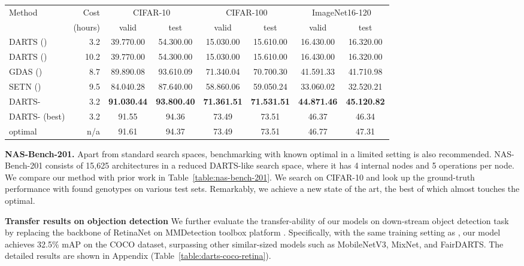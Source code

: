\documentclass{article} \usepackage{iclr2021_conference,times}
\newcommand{\citeyp}[1]{(\citeyear{#1})}
\begin{document}
\begin{table*}[tb!]
	\setlength{\tabcolsep}{2pt}
	\begin{center}
		\caption{Searching performance on NAS-Bench-201 \citep{dong2020nasbench201}. Our method robustly obtains new SOTA. Averaged on 4 runs of searching. : first-order, : second-order }
		\label{table:nas-bench-201}
		\small
		\begin{tabular}{lr*{6}{c}}
			\toprule
			Method	& Cost  & \multicolumn{2}{c}{CIFAR-10}  & \multicolumn{2}{c}{CIFAR-100}   & \multicolumn{2}{c}{ImageNet16-120}   \\
  & (hours) & valid & test & valid & test & valid & test \\
 \midrule
	DARTS \citeyp{liu2018darts} & 3.2 & 39.770.00 & 54.300.00 & 15.030.00 & 15.610.00 & 16.430.00 & 16.320.00 \\
	DARTS \citeyp{liu2018darts} & 10.2 & 39.770.00 & 54.300.00 & 15.030.00 & 15.610.00 & 16.430.00 & 16.320.00 \\
	GDAS \citeyp{dong2019searching}  &  8.7 & 89.890.08 & 93.610.09 & 71.340.04 & 70.700.30 & 41.591.33 & 41.710.98 \\
	SETN \citeyp{dong2019one} & 9.5 & 84.040.28 & 87.640.00 & 58.860.06 & 59.050.24 & 33.060.02 & 32.520.21   \\ 
DARTS- & 3.2 & \textbf{91.030.44}	& \textbf{93.800.40} &	\textbf{71.361.51} &	\textbf{71.531.51}  	& \textbf{44.871.46}	& \textbf{45.120.82} \\ 
	DARTS- (best) & 3.2 & 91.55 &	94.36&73.49&	73.51&	46.37&	46.34 \\
	optimal & n/a & 91.61 & 94.37 & 73.49 & 73.51 & 46.77 & 47.31 \\
			\bottomrule
		\end{tabular}
	\end{center}
	\vskip -0.15in
\end{table*}

\textbf{NAS-Bench-201.}
Apart from standard search spaces, benchmarking with known optimal in a limited setting is also recommended. NAS-Bench-201 \citep{dong2020nasbench201} consists of 15,625 architectures in a reduced DARTS-like search space, where it has 4 internal nodes and 5 operations per node. We compare our method with prior work in Table~\ref{table:nas-bench-201}. We search on CIFAR-10 and look up the ground-truth performance with found genotypes on various test sets. Remarkably, we achieve a new state of the art, the best of which almost touches the optimal.

\textbf{Transfer results on objection detection}
We further evaluate the transfer-ability of our models on down-stream object detection task by replacing the backbone of RetinaNet \citep{lin2017focal} on MMDetection toolbox platform \citep{chen2019mmdetection}. Specifically, with the same training setting as \cite{chu2019fair}, our model achieves  32.5\% mAP on the COCO dataset, surpassing other similar-sized models such as MobileNetV3, MixNet, and FairDARTS. The detailed results are shown in Appendix (Table~\ref{table:darts-coco-retina}).
\end{document}
